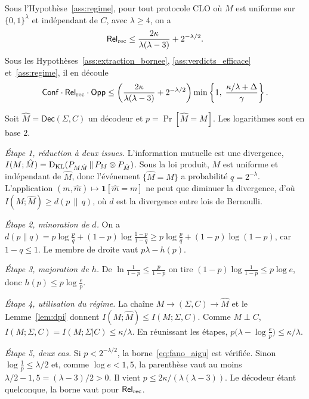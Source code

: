 \begin{sloppypar}
\begin{proposition}
\label{prop:borne_aigue}
Sous l'Hypoth\`ese~\ref{ass:regime}, pour tout protocole CLO o\`u $M$ est uniforme sur
$\{0,1\}^\lambda$ et ind\'ependant de $C$, avec $\lambda \geq 4$, on a
\begin{equation}
\mathsf{Rel}_{\mathrm{rec}} \leq \frac{2\kappa}{\lambda(\lambda-3)} + 2^{-\lambda/2}.
\label{eq:fano_aigu}
\end{equation}
Sous les Hypoth\`eses~\ref{ass:extraction_bornee}, \ref{ass:verdicts_efficace}
et~\ref{ass:regime}, il en d\'ecoule
\begin{equation}
\mathsf{Conf} \cdot \mathsf{Rel}_{\mathrm{rec}} \cdot \mathsf{Opp} \leq \left(\frac{2\kappa}{\lambda(\lambda-3)} + 2^{-\lambda/2}\right)
\min\left\{1,\; \frac{\kappa/\lambda + \Delta}{\gamma}\right\}.
\label{eq:trilemme_aigu}
\end{equation}
\end{proposition}

\begin{Preuve}
Soit $\hat M = \mathsf{Dec}(\Sigma,C)$ un d\'ecodeur et $p = \Pr[\hat M = M]$. Les
logarithmes sont en base $2$.

\emph{\'Etape 1, r\'eduction \`a deux issues.} L'information mutuelle est une
divergence, $I(M;\hat M) = \operatorname{D_{\text{KL}}}(P_{M\hat M}\,\|\,P_M \otimes P_{\hat M})$. Sous la loi
produit, $M$ est uniforme et ind\'ependant de $\hat M$, donc l'\'ev\'enement
$\{\hat M = M\}$ a probabilit\'e $q = 2^{-\lambda}$. L'application
$(m,\hat m) \mapsto \mathbf{1}[\hat m = m]$ ne peut que diminuer la divergence, d'o\`u
$I(M;\hat M) \geq d(p\,\|\,q)$, o\`u $d$ est la divergence entre lois de Bernoulli.

\emph{\'Etape 2, minoration de $d$.} On a
$d(p\|q) = p\log\frac{p}{q} + (1-p)\log\frac{1-p}{1-q} \geq p\log\frac{p}{q} + (1-p)\log(1-p)$,
car $1 - q \leq 1$. Le membre de droite vaut $p\lambda - h(p)$.

\emph{\'Etape 3, majoration de $h$.} De $\ln\frac{1}{1-p} \leq \frac{p}{1-p}$ on tire
$(1-p)\log\frac{1}{1-p} \leq p\log e$, donc $h(p) \leq p\log\frac{e}{p}$.

\emph{\'Etape 4, utilisation du r\'egime.} La cha\^ine $M \to (\Sigma,C) \to \hat M$ et
le Lemme~\ref{lem:dpi} donnent $I(M;\hat M) \leq I(M;\Sigma,C)$. Comme $M \perp C$,
$I(M;\Sigma,C) = I(M;\Sigma|C) \leq \kappa/\lambda$. En r\'eunissant les \'etapes,
$p\bigl(\lambda - \log\frac{e}{p}\bigr) \leq \kappa/\lambda$.

\emph{\'Etape 5, deux cas.} Si $p < 2^{-\lambda/2}$, la borne~\eqref{eq:fano_aigu}
est v\'erifi\'ee. Sinon $\log\frac1p \leq \lambda/2$ et, comme $\log e < 1{,}5$, la
parenth\`ese vaut au moins $\lambda/2 - 1{,}5 = (\lambda-3)/2 > 0$. Il vient
$p \leq 2\kappa/(\lambda(\lambda-3))$. Le d\'ecodeur \'etant quelconque, la borne vaut
pour $\mathsf{Rel}_{\mathrm{rec}}$.


\end{Preuve}
\end{sloppypar}
